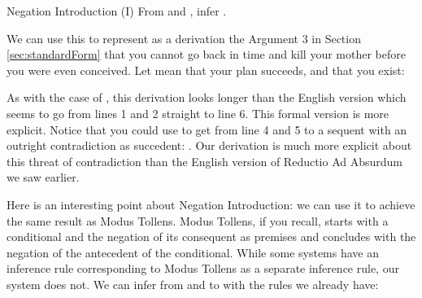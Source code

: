 \begin{infrule}
 \item[Negation Introduction (\p{\lnot}I)] From  and , infer .
\end{infrule}

We can use this to represent as a derivation the Argument 3 in Section   
\ref{sec:standardForm}  that you cannot go back in time and kill your mother 
before you were even conceived.  Let  mean that your plan succeeds, and 
 that you exist:


\begin{argument*}







\end{argument*}


As with the case of \disjI{}, this derivation looks longer than the English 
version which seems to go from lines 1 and 2 straight to line 6. This formal 
version is more explicit. Notice that you could use \conjI{} to get from line 4 
and 5 to a sequent with an outright contradiction as succedent: . Our derivation is much more explicit about this 
threat of contradiction than the English version of Reductio Ad Absurdum we saw 
earlier.

Here is an interesting point about Negation Introduction: we can use it to 
achieve the same result as Modus Tollens. Modus Tollens, if you recall, starts 
with a conditional and the negation of its consequent as premises and concludes 
with the negation of the antecedent of the conditional. While some systems have 
an inference rule corresponding to Modus Tollens as a separate inference rule, 
our system does not. We can infer from  and  to  
with the rules we already have:

\begin{argumentN}[7]







\end{argumentN}


